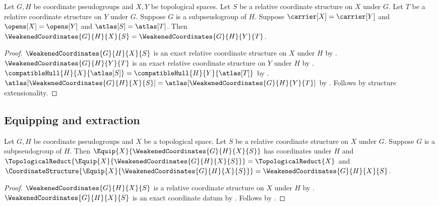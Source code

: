 \begin{theorem}\label{weakened_coordinates_same_fields}
    Let $G,H$ be coordinate pseudogroups and $X,Y$ be topological spaces.
    Let $S$ be a relative coordinate structure on $X$ under $G$.
    Let $T$ be a relative coordinate structure on $Y$ under $G$.
    Suppose $G$ is a subpseudogroup of $H$.
    Suppose $\carrier[X]=\carrier[Y]$ and $\opens[X]=\opens[Y]$ and $\atlas[S]=\atlas[T]$.
    Then $\WeakenedCoordinates{G}{H}{X}{S}=\WeakenedCoordinates{G}{H}{Y}{T}$.
\end{theorem}
\begin{proof}
    $\WeakenedCoordinates{G}{H}{X}{S}$ is an exact relative coordinate structure
        on $X$ under $H$ by .
    $\WeakenedCoordinates{G}{H}{Y}{T}$ is an exact relative coordinate structure
        on $Y$ under $H$ by .
    $\compatibleHull{H}{X}{\atlas[S]}=\compatibleHull{H}{Y}{\atlas[T]}$ by
        .
    $\atlas[\WeakenedCoordinates{G}{H}{X}{S}]=\atlas[\WeakenedCoordinates{G}{H}{Y}{T}]$ by
        .
    Follows by structure extensionality.
\end{proof}

\subsection{Equipping and extraction}

\begin{theorem}\label{equipped_weakened_coordinates}
    Let $G,H$ be coordinate pseudogroups and $X$ be a topological space.
    Let $S$ be a relative coordinate structure on $X$ under $G$.
    Suppose $G$ is a subpseudogroup of $H$.
    Then $\Equip{X}{\WeakenedCoordinates{G}{H}{X}{S}}$ has coordinates under $H$ and
        $\TopologicalReduct{\Equip{X}{\WeakenedCoordinates{G}{H}{X}{S}}}=\TopologicalReduct{X}$ and
        $\CoordinateStructure{\Equip{X}{\WeakenedCoordinates{G}{H}{X}{S}}}
            =\WeakenedCoordinates{G}{H}{X}{S}$.
\end{theorem}
\begin{proof}
    $\WeakenedCoordinates{G}{H}{X}{S}$ is a relative coordinate structure on $X$ under $H$ by
        .
    $\WeakenedCoordinates{G}{H}{X}{S}$ is an exact coordinate datum by
        .
    Follows by .
\end{proof}


